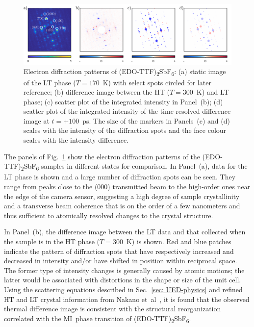\begin{figure}[ht!]
  \centering
  \includegraphics[width = \textwidth]{Figures/fig_EDOSb_UEDimages.pdf}
  \caption[Static and time-resolved electron diffraction patterns of
    (EDO-TTF)\textsubscript{2}SbF\textsubscript{6}.]{
    Electron diffraction patterns of (EDO-TTF)\textsubscript{2}SbF\textsubscript{6}:
    (a) static image of the LT phase ($T = 170$~K) with select spots circled for later reference;
    (b) difference image between the HT ($T = 300$~K) and LT phase;
    (c) scatter plot of the integrated intensity in Panel~(b);
    (d) scatter plot of the integrated intensity of the time-resolved difference image at $t = +100$~ps.
    The size of the markers in Panels~(c) and (d) scales with the intensity of the diffraction spots
    and the face colour scales with the intensity difference.
  }
  \label{fig: EDOSb-UEDimages}
\end{figure}

The panels of Fig.~\ref{fig: EDOSb-UEDimages} show the electron diffraction patterns
of the (EDO-TTF)\textsubscript{2}SbF\textsubscript{6} samples in different states for comparison.
%
In Panel~(a), data for the LT phase is shown and a large number of diffraction spots can be seen.
They range from peaks close to the (000) transmitted beam to the high-order ones
near the edge of the camera sensor, suggesting a high degree of sample crystallinity and
a transverse beam coherence that is on the order of a few nanometers and thus sufficient to
atomically resolved changes to the crystal structure.

In Panel~(b), the difference image between the LT data and that collected when the sample is in
the HT phase ($T = 300$~K) is shown. Red and blue patches indicate the pattern of diffraction spots
that have respectively increased and decreased in intensity and/or have shifted in position within
reciprocal space. The former type of intensity changes is generally caused by atomic motions;
the latter would be associated with distortions in the shape or size of the unit cell.
Using the scattering equations described in Sec.~\ref{sec: UED-physics} and
refined HT and LT crystal information from Nakano et~al~\cite{NakanoX},
it is found that the observed thermal difference image is consistent with
the structural reorganization correlated with the MI~phase transition
of (EDO-TTF)\textsubscript{2}SbF\textsubscript{6}.

